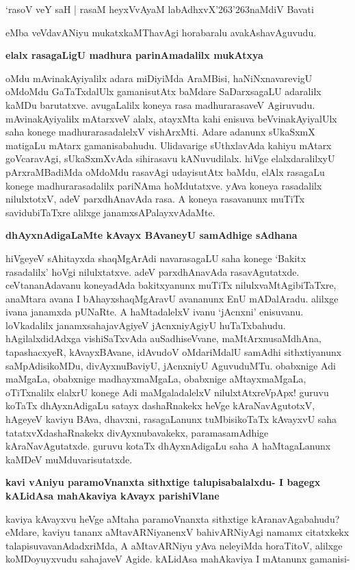\begin{shloka}
`rasoV veY saH | rasaM heyxVvAyaM labAdhxvX\char'263\char'263naMdiV Bavati
\end{shloka}

eMba veVdavANiyu mukatxkaMThavAgi horabaralu avakAshavAguvudu.

{\bf elalx rasagaLigU madhura parinAmadalilx mukAtxya}

oMdu mAvinakAyiyalilx adara miDiyiMda AraMBisi, haNiNxnavarevigU oMdoMdu GaTaTxdalUlx gamanisutAtx baMdare SaDarxsagaLU adaralilx kaMDu barutatxve. avugaLalilx koneya rasa madhurarasaveV Agiruvudu. mAvinakAyiyalilx mAtarxveV alalx, atayxMta kahi enisuva beVvinakAyiyalUlx saha konege madhurarasadalelxV vishArxMti. Adare adanunx sUkaSxmX matigaLu mAtarx gamanisabahudu. Ulidavarige sUthxlavAda kahiyu mAtarx goVcaravAgi, sUkaSxmXvAda sihirasavu kANuvudilalx. hiVge elalxdaralilxyU pArxraMBadiMda oMdoMdu rasavAgi udayisutAtx baMdu, elAlx rasagaLu konege madhurarasadalilx pariNAma hoMdutatxve. yAva koneya rasadalilx nilulxtotxV, adeV parxdhAnavAda rasa. A koneya rasavanunx muTiTx savidubiTaTxre alilxge janamxsAPalayxvAdaMte.

{\bf dhAyxnAdigaLaMte kAvayx BAvaneyU samAdhige sAdhana}

hiVgeyeV sAhitayxda shaqMgArAdi navarasagaLU saha konege `Bakitx rasadalilx' hoVgi nilulxtatxve. adeV parxdhAnavAda rasavAgutatxde. ceVtananAdavanu koneyadAda bakitxyanunx muTiTx nilulxvaMtAgibiTaTxre, anaMtara avana I bAhayxshaqMgAravU avananunx EnU mADalAradu. alilxge ivana janamxda pUNaRte. A haMtadalelxV ivanu `jAcnxni' enisuvanu. loVkadalilx janamxsahajavAgiyeV jAcnxniyAgiyU huTaTxbahudu. hAgilalxdidAdxga vishiSaTxvAda auSadhiseVvane, maMtArxnusaMdhAna, tapashacxyeR, kAvayxBAvane, idAvudoV oMdariMdalU samAdhi sithxtiyanunx saMpAdisikoMDu, divAyxnuBaviyU, jAcnxniyU AguvuduMTu. obabxnige Adi maMgaLa, obabxnige madhayxmaMgaLa, obabxnige aMtayxmaMgaLa, oTiTxnalilx elalxrU konege Adi maMgaladalelxV nilulxtAtxreVpApx! guruvu koTaTx dhAyxnAdigaLu satayx dashaRnakekx heVge kAraNavAgutotxV, hAgeyeV kaviyu BAva, dhavxni, rasagaLanunx tuMbisikoTaTx kAvayxvU saha tatatxvXdashaRnakekx divAyxnubavakekx, paramasamAdhige kAraNavAgutatxde. guruvu kotaTx dhAyxnAdigaLu saha A haMtagaLanunx kaMDeV muMduvarisutatxde.

{\bf kavi vAniyu paramoVnanxta sithxtige talupisabalalxdu- I bagegx kALidAsa mahAkaviya kAvayx parishiVlane}

kaviya kAvayxvu heVge aMtaha paramoVnanxta sithxtige kAranavAgabahudu? eMdare, kaviyu tananx aMtavARNiyanenxV bahivARNiyAgi namamx citatxkekx talapisuvavanAdadxriMda, A aMtavARNiyu yAva neleyiMda horaTitoV, alilxge koMDoyuyxvudu sahajaveV Agide. kALidAsa mahAkaviya I mAtanunx gamanisi-

